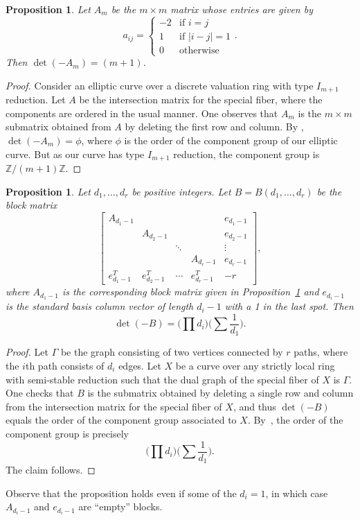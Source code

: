 \documentclass[reqno]{amsart}
\newtheorem{proposition}[thm]{Proposition}
\theoremstyle{definition}
\theoremstyle{remark}
\def\Z{\mathbb{Z}}
\begin{document}
\begin{proposition}\label{prop:am-defn-det}
  Let $A_m$ be the $m \times m$ matrix whose entries are given by
  \[
  a_{ij} = \begin{cases}
    -2 & \text{if } i = j \\
    1 & \text{if } |i - j| = 1\\
    0 & \text{otherwise}
  \end{cases}.
  \]
  Then $\det (-A_m) = (m+1)$.
\end{proposition}

\begin{proof}
  Consider an elliptic curve over a discrete valuation ring with type $I_{m+1}$ reduction. Let $A$ be the intersection matrix for the special fiber, where the components are ordered in the usual manner. One observes that $A_m$ is the $m \times m$ submatrix obtained from $A$ by deleting the first row and column. By \cite[Corollary~1.3]{lorenzini}, $\det (-A_m) = \phi$, where $\phi$ is the order of the component group of our elliptic curve. But as our curve has type $I_{m+1}$ reduction, the component group is $\Z/(m+1)\Z$.
\end{proof}

\begin{proposition}\label{prop:block-Am-determinant}
  Let $d_1, \dots, d_r$ be positive integers. Let $B = B(d_1, \dots, d_r)$ be the block matrix
  \[
  \left[\begin{array}{ccccc}
    A_{d_{1}-1} & & & & e_{d_{1}-1} \\
    & A_{d_{2}-1} & & & e_{d_{2}-1} \\
    & & \ddots & & \vdots \\
    & & & A_{d_{r}-1} & e_{d_{r}-1} \\
    e_{d_{1}-1}^T & e_{d_{2}-1}^T & \cdots & e_{d_{r}-1}^T & -r
  \end{array}\right],
  \]
  where $A_{d_{1}-1}$ is the corresponding block matrix given in Proposition~\ref{prop:am-defn-det} and $e_{d_{i}-1}$ is the standard basis column vector of length $d_i-1$ with a 1 in the last spot. Then
  \[
  \det (-B) = \bigg(\prod d_i\bigg)\bigg(\sum \frac{1}{d_1}\bigg).
  \]
\end{proposition}

\begin{proof}
  Let $\Gamma$ be the graph consisting of two vertices connected by $r$ paths, where the $i$th path consists of $d_i$ edges. Let $X$ be a curve over any strictly local ring with semi-stable reduction such that the dual graph of the special fiber of $X$ is $\Gamma$. One checks that $B$ is the submatrix obtained by deleting a single row and column from the intersection matrix for the special fiber of $X$, and thus $\det (-B)$ equals the order of the component group associated to $X$. By~\cite[Prop.~9.6.10]{blr}, the order of the component group is precisely
  \[
  \bigg(\prod d_i\bigg)\bigg(\sum \frac{1}{d_1}\bigg).
  \]
  The claim follows.
\end{proof}
Observe that the proposition holds even if some of the $d_i = 1$, in which case $A_{d_i - 1}$ and $e_{d_i - 1}$ are ``empty'' blocks.
\end{document}
